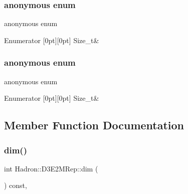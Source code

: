\subsubsection{\texorpdfstring{anonymous enum}{anonymous enum}}
{\footnotesize\ttfamily anonymous enum}

\begin{DoxyEnumFields}{Enumerator}
[0pt][0pt]{}\mbox{\label{structHadron_1_1D3E2MRep_af142d2521173df2241c0f686b2a29aa6a2044360bbc5b9f2b2fc5357007fc1e88}} 
Size\+\_\+t&\\
\hline

\end{DoxyEnumFields}
\mbox{\label{structHadron_1_1D3E2MRep_af142d2521173df2241c0f686b2a29aa6}} 
\subsubsection{\texorpdfstring{anonymous enum}{anonymous enum}}
{\footnotesize\ttfamily anonymous enum}

\begin{DoxyEnumFields}{Enumerator}
[0pt][0pt]{}\mbox{\label{structHadron_1_1D3E2MRep_af142d2521173df2241c0f686b2a29aa6a2044360bbc5b9f2b2fc5357007fc1e88}} 
Size\+\_\+t&\\
\hline

\end{DoxyEnumFields}


\subsection{Member Function Documentation}
\mbox{\label{structHadron_1_1D3E2MRep_a73c88cd77967138738e5b0bcdda21ab9}} 
\subsubsection{\texorpdfstring{dim()}{dim()}\hspace{0.1cm}{\footnotesize\ttfamily [1/2]}}
{\footnotesize\ttfamily int Hadron\+::\+D3\+E2\+M\+Rep\+::dim (\begin{DoxyParamCaption}{ }\end{DoxyParamCaption}) const\hspace{0.3cm}{\ttfamily [inline]}, {\ttfamily [virtual]}}

